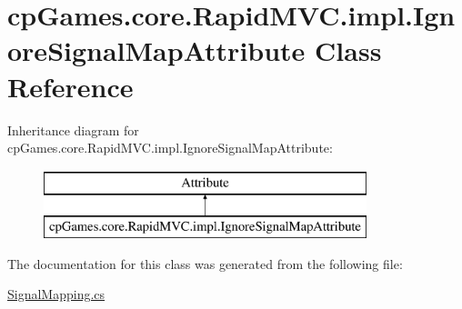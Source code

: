 \hypertarget{classcp_games_1_1core_1_1_rapid_m_v_c_1_1impl_1_1_ignore_signal_map_attribute}{}\section{cp\+Games.\+core.\+Rapid\+M\+V\+C.\+impl.\+Ignore\+Signal\+Map\+Attribute Class Reference}
\label{classcp_games_1_1core_1_1_rapid_m_v_c_1_1impl_1_1_ignore_signal_map_attribute}
Inheritance diagram for cp\+Games.\+core.\+Rapid\+M\+V\+C.\+impl.\+Ignore\+Signal\+Map\+Attribute\+:\begin{figure}[H]
\begin{center}
\leavevmode
\includegraphics[height=2.000000cm]{classcp_games_1_1core_1_1_rapid_m_v_c_1_1impl_1_1_ignore_signal_map_attribute}
\end{center}
\end{figure}


The documentation for this class was generated from the following file\+:\begin{DoxyCompactItemize}
\item 
\mbox{\hyperlink{_signal_mapping_8cs}{Signal\+Mapping.\+cs}}\end{DoxyCompactItemize}
